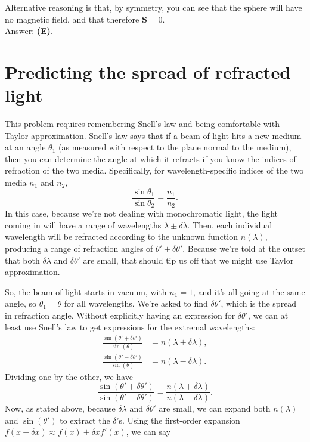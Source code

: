 \documentclass[11pt]{paper}
\newcommand{\answer}[1]{Answer: \textbf{(#1)}.}
\begin{document}
Alternative reasoning is that, by symmetry, you can see that the sphere will have no magnetic field, and that therefore $\mathbf{S}=0$.\\

\answer{E}

\section{Predicting the spread of refracted light}
This problem requires remembering Snell's law and being comfortable with Taylor approximation.  Snell's law says that if a beam of light hits a new medium at an angle $\theta_1$ (as measured with respect to the plane normal to the medium), then you can determine the angle at which it refracts if you know the indices of refraction of the two media.  Specifically, for wavelength-specific indices of the two media $n_1$ and $n_2$,
\begin{equation}
	\frac{\sin\theta_1}{\sin\theta_2} = \frac{n_1}{n_2}.
\end{equation}
In this case, because we're not dealing with monochromatic light, the light coming in will have a range of wavelengths $\lambda\pm\delta\lambda$.  Then, each individual wavelength will be refracted according to the unknown function $n(\lambda)$, producing a range of refraction angles of $\theta'\pm\delta\theta'$.  Because we're told at the outset that both $\delta\lambda$ and $\delta\theta'$ are small, that should tip us off that we might use Taylor approximation.

So, the beam of light starts in vacuum, with $n_1 = 1$, and it's all going at the same angle, so $\theta_1 = \theta$ for all wavelengths.  We're asked to find $\delta\theta'$, which is the spread in refraction angle.  Without explicitly having an expression for $\delta\theta'$, we can at least use Snell's law to get expressions for the extremal wavelengths:
\begin{align}
	\frac{\sin\left(\theta' + \delta\theta'\right)}{\sin\left(\theta\right)} &= n(\lambda + \delta\lambda),\\
	\frac{\sin\left(\theta' - \delta\theta'\right)}{\sin\left(\theta\right)} &= n(\lambda - \delta\lambda).
\end{align}
Dividing one by the other, we have
\begin{equation}
	\frac{\sin\left(\theta' + \delta\theta'\right)}{\sin\left(\theta' - \delta\theta'\right)} = \frac{n(\lambda + \delta\lambda)}{n(\lambda - \delta\lambda)}.
\end{equation}
Now, as stated above, because $\delta\lambda$ and $\delta\theta'$ are small, we can expand both $n(\lambda)$ and $\sin(\theta')$ to extract the $\delta$'s.  Using the first-order expansion $f(x+\delta x)\approx f(x) + \delta xf'(x)$, we can say
\end{document}

